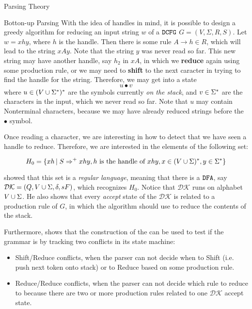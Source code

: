 \begin{section}{Parsing Theory}
\begin{subsection}{Botton-up Parsing}
With the idea of handles in mind, it is possible to design a greedy algorithm
for reducing an input string $w$ of a $\texttt{DCFG}$ $G = (V, \Sigma, R, S)$. Let $w = xhy$, where $h$ is the
handle. Then there is some rule $A \rightarrow h \in R$, which will lead to the
string $xAy$. Note that the string $y$ was never read so far. This new string
may have another handle, say $h_2$ in $xA$, in which we \textbf{reduce} again
using some production rule, or we may need to \textbf{shift} to the next caracter
in trying to find the handle for the string. Therefore, we may get into a state
$$u \bullet v$$
where $u \in (V \cup \Sigma^*)^*$ are the symbols currently \textit{on the stack},
and $v \in \Sigma^*$ are the characters in the input, which we never read so far.
Note that $u$ may contain Nonterminal characters, because we may have already
reduced strings before the $\bullet$ symbol.

Once reading a character, we are interesting in how to detect that we have
seen a handle to reduce. Therefore, we are interested in the elements of
the following set:

$$H_0 = \{xh\,|\;S \Rightarrow^+ xhy, h \text{ is the handle of } xhy, x \in (V \cup \Sigma)^*, y \in \Sigma^*\}$$

\cite{knuth1965translation} showed that this set is a \textit{regular language},
meaning that there is a $\texttt{DFA}$, say $\mathcal{DK} = (Q, V \cup \Sigma, \delta, s F)$, which
recognizes $H_0$. Notice that $\mathcal{DK}$ runs on alphabet $V \cup \Sigma$.
He also shows that every \textit{accept} state of the $\mathcal{DK}$ is related
to a production rule of $G$, in which the algorithm should use to reduce the
contents of the stack.

Furthermore, \cite{sipser2012} shows that the construction of the
\DFA can be used to test if the grammar is \DCFG by tracking two
conflicts in its state machine:

\begin{itemize}
	\item Shift/Reduce conflicts, when the parser can not decide when
	to Shift (i.e. push next token onto stack) or to Reduce based on
	some production rule.

	\item Reduce/Reduce conflicts, when the parser can not decide which
	rule to reduce to because there are two or more production rules
	related to one $\mathcal{DK}$ accept state.
\end{itemize}


\end{subsection}
\end{section}
